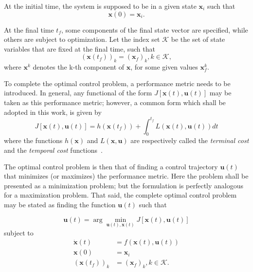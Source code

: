 At the initial time, the system is supposed to be in a given state \(\mathbf{x}_i\) such that 
\begin{equation} \label{eq:generic_initial_constraint}
    \mathbf{x}(0) = \mathbf{x}_i.
\end{equation}

At the final time \(t_f\), some components of the final state vector are specified, while others are subject to optimization. Let the index set \(\mathcal{K}\) be the set of state variables that are fixed at the final time, such that
\begin{equation} \label{eq:generic_final_constraint}
    (\mathbf{x}(t_f))_k = (\mathbf{x}_{f})_k, k\in \mathcal{K},
\end{equation}
where \(\mathbf{x}^k\) denotes the k-th component of \(\mathbf{x}\), for some given values \(\mathbf{x}_{f}^k\).

To complete the optimal control problem, a performance metric needs to be introduced. In general, any functional of the form \(J[\mathbf{x}(t), \mathbf{u}(t)]\) may be taken as this performance metric; however, a common form which shall be adopted in this work, is given by
\begin{equation} \label{eq:generic_cost}
    J[\mathbf{x}(t), \mathbf{u}(t)] = h(\mathbf{x}(t_f)) + \int_0^{t_f} L(\mathbf{x}(t), \mathbf{u}(t)) dt
\end{equation}
where the functions \(h(\mathbf{x})\) and \(L(\mathbf{x}, \mathbf{u})\) are respectively called the \textit{terminal cost} and the \textit{temporal cost} functions~\cite{bertsekas}.\

The optimal control problem is then that of finding a control trajectory \(\mathbf{u}(t)\) that minimizes (or maximizes) the performance metric. Here the problem shall be presented as a minimization problem; but the formulation is perfectly analogous for a maximization problem. That said, the complete optimal control problem may be stated as finding the function \(\mathbf{u}(t)\) such that~\cite{bryson_applied_optimal_control}

\begin{equation} \label{eq:argmin_cost}
    \mathbf{u}(t) = \arg \min_{\mathbf{u}(t), \mathbf{x}(t)} J[\mathbf{x}(t), \mathbf{u}(t)]
\end{equation}
subject to
\begin{align}
    \dot{\mathbf{x}}(t) &= f(\mathbf{x}(t), \mathbf{u}(t)) \\
    \mathbf{x}(0) &= \mathbf{x}_i \\
    \left(\mathbf{x}(t_f)\right)_k &= (\mathbf{x}_f)_k, k\in \mathcal{K}.
\end{align}

